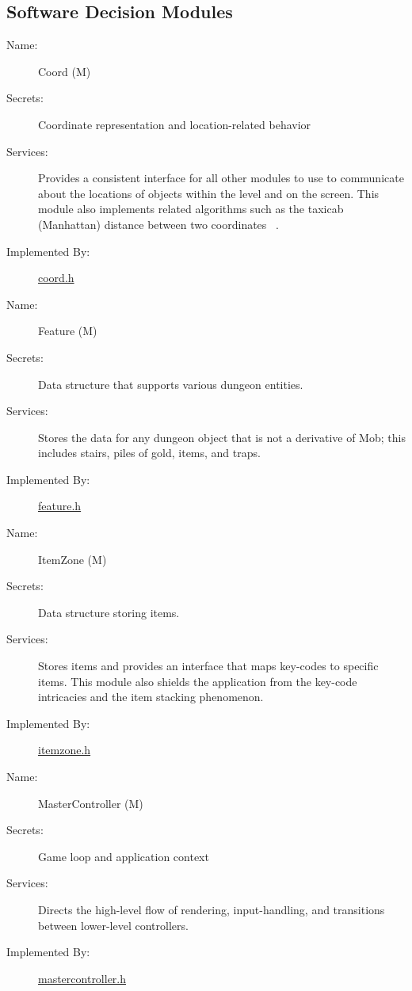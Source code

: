 \documentclass[12pt, titlepage]{article}
\newcounter{mnum}
\newcommand{\mdprint}[1]{\addtocounter{mnum}{1} #1 (M\themnum)}
\begin{document}
    \subsection{Software Decision Modules}

        \bigskip\begin{description}
            \item[Name:]\mdprint{Coord}
            \item[Secrets:]Coordinate representation and location-related behavior
            \item[Services:]Provides a consistent interface for all other modules to use to communicate about the locations of objects within the level and on the screen.  This module also implements related algorithms such as the taxicab (Manhattan) distance between two coordinates ~\citep{Taxicab}.
            \item[Implemented By:]\href{run:../../../src/include/uistate.h}{coord.h}
        \end{description}

        \bigskip\begin{description}
            \item[Name:]\mdprint{Feature}
            \item[Secrets:]Data structure that supports various dungeon entities.
            \item[Services:]Stores the data for any dungeon object that is not a derivative of Mob; this includes stairs, piles of gold, items, and traps.
            \item[Implemented By:]\href{run:../../../src/include/feature.h}{feature.h}
        \end{description}

        \bigskip\begin{description}
            \item[Name:]\mdprint{ItemZone}
            \item[Secrets:]Data structure storing items.
            \item[Services:]Stores items and provides an interface that maps key-codes to specific items.  This module also shields the application from the key-code intricacies and the item stacking phenomenon. 
            \item[Implemented By:]\href{run:../../../src/include/itemzone.h}{itemzone.h}
        \end{description}

        \bigskip\begin{description}
            \item[Name:]\mdprint{MasterController}
            \item[Secrets:]Game loop and application context
            \item[Services:]Directs the high-level flow of rendering, input-handling, and transitions between lower-level controllers.
            \item[Implemented By:]\href{run:../../../src/include/mastercontroller.h}{mastercontroller.h}
        \end{description}
\end{document}
